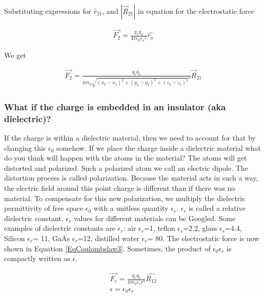 \documentclass{ximera}
\begin{document}
\begin{example}
\begin{explanation}
Substituting expressions for $\hat{r}_{21}$, and $|\vec{R}_{21}|$ in equation for the electrostatic force 

\begin{eqnarray}
\vec{F_2}=\frac{q_1 q_2}{4 \pi \epsilon_{0} {r_a}^2} \hat{r_a}
\end{eqnarray}

 

 
We get


\begin{eqnarray}
\vec{F_2}=\frac{q_1 q_2}{4 \pi \epsilon_{0} {\sqrt{(x_2 - x_1)^2 +(y_2 - y_1)^2 +(z_2 - z_1)^2}
}^3} \vec{R}_{21} \label{eqonecharge}
\end{eqnarray}







\end{explanation}


\end{example}




\subsubsection{What if the charge is embedded in an insulator (aka dielectric)?} 

If the charge is within a dielectric material, then we need to account for that by changing this $\epsilon_0$ somehow. If we place the charge inside a dielectric material what do you think will happen with the atoms in the material? The atoms will get distorted and polarized. Such a polarized atom we call an electric dipole. The distortion process is called polarization. Because the material acts in such a way, the electric field around this point charge is different than if there was no material. To compensate for this new polarization, we multiply the dielectric permittivity of free space $\epsilon_0$ with a unitless quantity $\epsilon_r$.  $\epsilon_r$ is called a relative dielectric constant. $\epsilon_r$ values for different materials can be Googled. Some examples of dielectric constants are $\epsilon_r$: air $\epsilon_r$=1,  teflon $\epsilon_r$=2.2, glass $\epsilon_r$=4.4, Silicon $\epsilon_r$= 11, GaAs $\epsilon_r$=12, distilled water $\epsilon_r$= 80. The electrostatic force is now shown in Equation \ref{EqCoulombslaw3}. Sometimes, the product of $\epsilon_0 \epsilon_r$ is compactly written as $\epsilon$.

\begin{eqnarray}
\vec{F_e}=\frac{q_1 q_2}{4 \pi \epsilon_0 \epsilon_r r^2} \hat{R_{12}} \label{EqCoulombslaw3} \\
\epsilon = \epsilon_0 \epsilon_r
\end{eqnarray}
\end{document}
